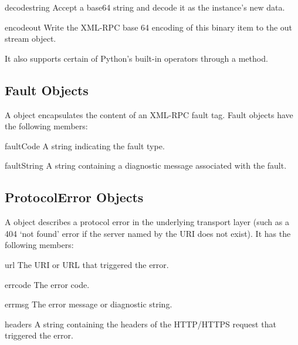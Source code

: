 \begin{methoddesc}[Binary]{decode}{string}
Accept a base64 string and decode it as the instance's new data.
\end{methoddesc}

\begin{methoddesc}[Binary]{encode}{out}
Write the XML-RPC base 64 encoding of this binary item to the out
stream object.
\end{methoddesc}

It also supports certain of Python's built-in operators through a
 method.


\subsection{Fault Objects \label{fault-objects}}

A  object encapsulates the content of an XML-RPC fault tag.
Fault objects have the following members:

\begin{memberdesc}{faultCode}
A string indicating the fault type.
\end{memberdesc}

\begin{memberdesc}{faultString}
A string containing a diagnostic message associated with the fault.
\end{memberdesc}


\subsection{ProtocolError Objects \label{protocol-error-objects}}

A  object describes a protocol error in the
underlying transport layer (such as a 404 `not found' error if the
server named by the URI does not exist).  It has the following
members:

\begin{memberdesc}{url}
The URI or URL that triggered the error.
\end{memberdesc}

\begin{memberdesc}{errcode}
The error code.
\end{memberdesc}

\begin{memberdesc}{errmsg}
The error message or diagnostic string.
\end{memberdesc}

\begin{memberdesc}{headers}
A string containing the headers of the HTTP/HTTPS request that
triggered the error.
\end{memberdesc}

